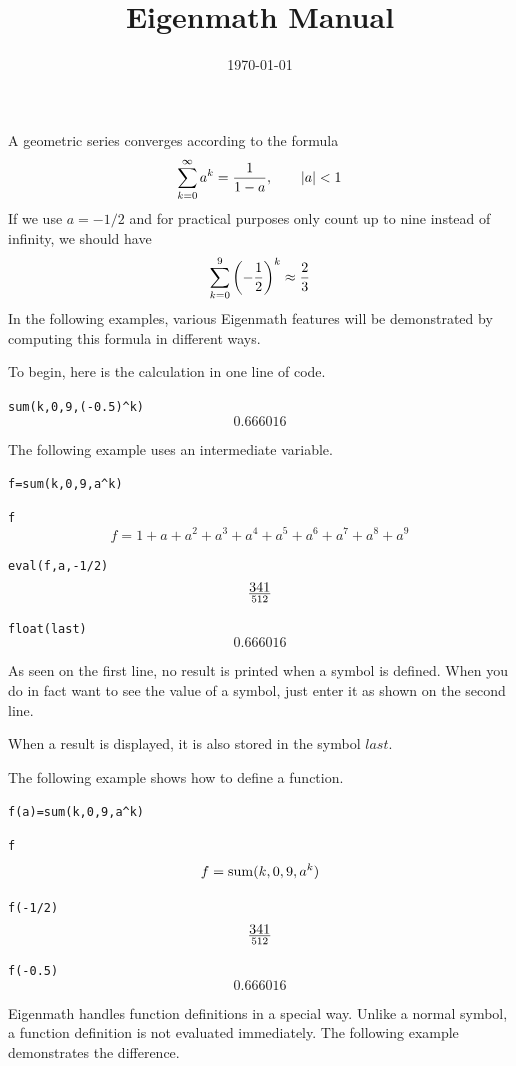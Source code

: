 \documentclass[11pt]{article}
\title{Eigenmath Manual}
\date{\today}
\begin{document}
\maketitle

\newpage



\newpage



\newpage

\noindent
A geometric series converges according to the formula
$$\sum_{k=0}^\infty a^k={1\over1-a},\qquad|a|<1$$
If we use $a=-1/2$ and for practical purposes only count up to nine instead of infinity,
we should have
$$\sum_{k=0}^9\left(-{1\over2}\right)^k\approx{2\over3}$$
In the following examples, various Eigenmath features will be demonstrated
by computing this formula in different ways.

\medskip
\noindent
To begin, here is the calculation in one line of code.

\medskip
\verb$sum(k,0,9,(-0.5)^k)$
$$0.666016$$

\medskip
\noindent
The following example uses an intermediate variable.

\medskip
\verb$f=sum(k,0,9,a^k)$

\verb$f$
$$f=1+a+a^2+a^3+a^4+a^5+a^6+a^7+a^8+a^9$$

\verb$eval(f,a,-1/2)$
$$341\over512$$

\verb$float(last)$
$$0.666016$$

\medskip
\noindent
As seen on the first line, no result is printed when a symbol is defined.
When you do in fact want to see the value of a symbol,
just enter it as shown on the second line.

\medskip
\noindent
When a result is displayed, it is also stored in the symbol $last$.

\newpage

\noindent
The following example shows how to define a function.

\medskip
\verb$f(a)=sum(k,0,9,a^k)$

\verb$f$
$$f=\mathop{\rm sum}(k,0,9,a^k)$$

\verb$f(-1/2)$
$$341\over512$$

\verb$f(-0.5)$
$$0.666016$$

\medskip
\noindent
Eigenmath handles function definitions in a special way.
Unlike a normal symbol, a function definition is not evaluated immediately.
The following example demonstrates the difference.
\end{document}

